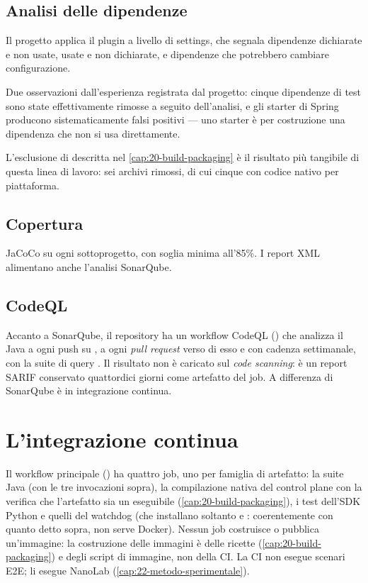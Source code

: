 \subsection{Analisi delle dipendenze}

Il progetto applica il plugin  a livello di settings,
che segnala dipendenze dichiarate e non usate, usate e non dichiarate, e
dipendenze che potrebbero cambiare configurazione.

Due osservazioni dall'esperienza registrata dal progetto: cinque dipendenze di
test sono state effettivamente rimosse a seguito dell'analisi, e gli starter di
Spring producono sistematicamente falsi positivi --- uno starter \`e per
costruzione una dipendenza che non si usa direttamente.

L'esclusione di  descritta nel
\cref{cap:20-build-packaging} \`e il risultato pi\`u tangibile di questa linea di
lavoro: sei archivi rimossi, di cui cinque con codice nativo per piattaforma.

\subsection{Copertura}

JaCoCo su ogni sottoprogetto, con soglia minima all'85\%. I report XML
alimentano anche l'analisi SonarQube.

\subsection{CodeQL}

Accanto a SonarQube, il repository ha un workflow CodeQL () che
analizza il Java a ogni push su , a ogni \emph{pull request} verso
di esso e con cadenza settimanale, con la suite di query
. Il risultato non \`e caricato sul \emph{code
scanning}: \`e un report SARIF conservato quattordici giorni come artefatto del
job. A differenza di SonarQube \`e in integrazione continua.

\section{L'integrazione continua}

Il workflow principale () ha quattro job, uno per famiglia di
artefatto: la suite Java (con le tre invocazioni sopra), la compilazione nativa
del control plane con la verifica che l'artefatto sia un eseguibile
(\cref{cap:20-build-packaging}), i test dell'SDK Python e quelli del watchdog
(che installano soltanto  e : coerentemente con quanto detto sopra, non
serve Docker). Nessun job costruisce o pubblica un'immagine: la costruzione delle
immagini \`e delle ricette (\cref{cap:20-build-packaging}) e degli script di
immagine, non della CI. La CI non esegue scenari E2E; li esegue NanoLab
(\cref{cap:22-metodo-sperimentale}).

